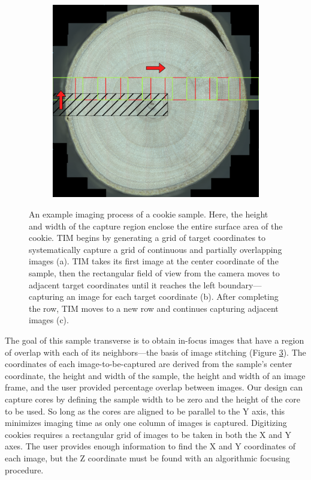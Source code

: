 \documentclass[a4paper,12pt]{article}
\begin{document}
\begin{figure}
\begin{subfigure}{.3\textwidth}
      \caption{}
      \label{SUBFIGURE LABEL 2}
  \end{subfigure}
  \begin{subfigure}{.3\textwidth}
      \centering
      \includegraphics[width=.95\linewidth]{../content/cookie_figure_second_row.png}  
      \caption{}
      \label{SUBFIGURE LABEL 3}
  \end{subfigure} %
  \caption{An example imaging process of a cookie sample. Here, the height and width of the capture region enclose the entire surface area of the cookie.  TIM begins by generating a grid of target coordinates to systematically capture a grid of continuous and partially overlapping images (a). TIM takes its first image at the center coordinate of the sample, then the rectangular field of view from the camera moves to adjacent target coordinates until it reaches the left boundary---capturing an image for each target coordinate (b). After completing the row, TIM moves to a new row and continues capturing adjacent images (c). }
  \label{FIGURE LABEL}
  \end{figure}

The goal of this sample transverse is to obtain in-focus images that have a region of overlap with each of its neighbors---the basis of image stitching (Figure \ref{FIGURE LABEL}). 
The coordinates of each image-to-be-captured are derived from the sample's center coordinate, the height and width of the sample, the height and width of an image frame, and the user provided percentage overlap between images.  
Our design can capture cores by defining the sample width to be zero and the height of the core to be used. So long as the cores are aligned to be parallel to the Y axis, this minimizes imaging time as only one column of images is captured.
Digitizing cookies requires a rectangular grid of images to be taken in both the X and Y axes. 
The user provides enough information to find the X and Y coordinates of each image, but the Z coordinate must be found with an algorithmic focusing procedure. 
\end{document}
